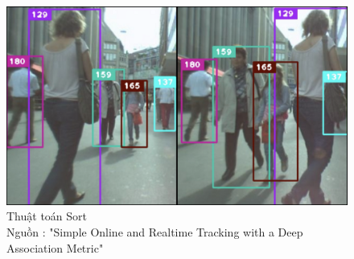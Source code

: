 \FloatBarrier
\begin{figure}[htp]
\begin{center}
\includegraphics[scale=0.3]{chap5/c5_figs/sort.png}
\end{center}
\caption{Thuật toán Sort\\Nguồn : "Simple Online and Realtime Tracking with a Deep Association Metric" \cite{wojke2017simple}}
\label{fig:sort}
\end{figure}
\FloatBarrier

